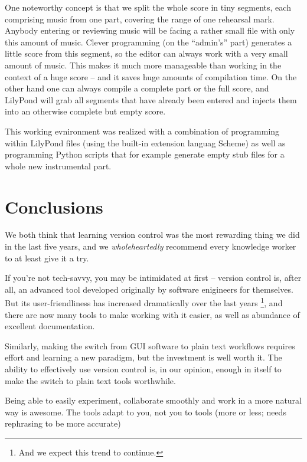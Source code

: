 \documentclass[11pt,a4paper]{article}
\begin{document}
One noteworthy concept is that we split the whole score in tiny segments, each comprising
music from one part, covering the range of one rehearsal mark. Anybody entering or
reviewing music will be facing a rather small file with only this amount of music.
Clever programming (on the “admin's” part) generates a little score from this segment, so
the editor can always work with a very small amount of music. This makes it much more
manageable than working in the context of a huge score -- and it saves huge amounts of
compilation time.
On the other hand one can always compile a complete part or the full score, and LilyPond
will grab all segments that have already been entered and injects them into an otherwise
complete but empty score.

This working evnironment was realized with a combination of programming within LilyPond files (using the built-in extension languag Scheme) as well as programming Python scripts
that for example generate empty stub files for a whole new instrumental part.

\section{Conclusions}\label{sec:conclusions}

We both think that learning version control was the most rewarding thing we did
in the last five years, and we \emph{wholeheartedly} recommend every knowledge
worker to at least give it a try.

If you're not tech-savvy, you may be intimidated at first -- version control
is, after all, an advanced tool developed originally by software enigineers
for themselves.  But its user-friendliness has increased dramatically over the
last years%
\footnote{And we expect this trend to continue.},
and there are now many tools to make working with it easier, as well as abundance
of excellent documentation.

Similarly, making the switch from \textsc{GUI} software to plain text workflows
requires effort and learning a new paradigm, but the investment is well worth it.
The ability to effectively use version control is, in our opinion, enough in itself
to make the switch to plain text tools worthwhile.

Being able to easily experiment, collaborate smoothly and work in a more natural way
is awesome.  The tools adapt to you, not you to tools (more or less; needs rephrasing to be more accurate)
\end{document}
